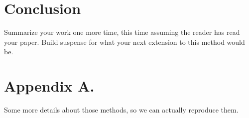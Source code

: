 \documentclass[twoside,11pt]{article}
\begin{document}
\section{Conclusion} 
Summarize your work one more time, this time assuming the reader has read your paper.
Build suspense for what your next extension to this method would be.




\appendix
\section*{Appendix A.}
Some more details about those methods, so we can actually reproduce them.
\end{document}
